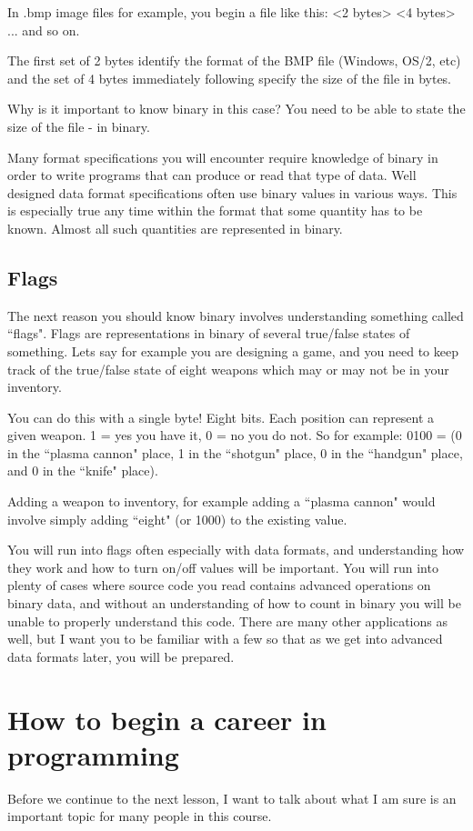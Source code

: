 \documentclass[a4paper,12pt]{article}
\let\stdsection\section
\renewcommand\section{\newpage\stdsection}
\begin{document}
In .bmp image files for example, you begin a file like this:
<2 bytes> <4 bytes> ... and so on.

The first set of 2 bytes identify the format of the BMP file (Windows, OS/2, etc) and the set of 4 bytes immediately following specify the size of the file in bytes.

Why is it important to know binary in this case? You need to be able to state the size of the file - in binary.

Many format specifications you will encounter require knowledge of binary in order to write programs that can produce or read that type of data. Well designed data format specifications often use binary values in various ways. This is especially true any time within the format that some quantity has to be known. Almost all such quantities are represented in binary.
\subsection{Flags}
The next reason you should know binary involves understanding something called ``flags". Flags are representations in binary of several true/false states of something. Lets say for example you are designing a game, and you need to keep track of the true/false state of eight weapons which may or may not be in your inventory.

You can do this with a single byte! Eight bits. Each position can represent a given weapon. 1 = yes you have it, 0 = no you do not. So for example:
0100 = (0 in the ``plasma cannon" place, 1 in the ``shotgun" place, 0 in the ``handgun" place, and 0 in the ``knife" place).

Adding a weapon to inventory, for example adding a ``plasma cannon" would involve simply adding ``eight" (or 1000) to the existing value.

You will run into flags often especially with data formats, and understanding how they work and how to turn on/off values will be important. You will run into plenty of cases where source code you read contains advanced operations on binary data, and without an understanding of how to count in binary you will be unable to properly understand this code.
There are many other applications as well, but I want you to be familiar with a few so that as we get into advanced data formats later, you will be prepared.
\section{How to begin a career in programming}
Before we continue to the next lesson, I want to talk about what I am sure is an important topic for many people in this course.
\end{document}
